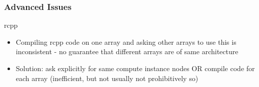 \documentclass[aspectratio=169,notheorems]{beamer}
\theoremstyle{plain}
\theoremstyle{plain}
\numberwithin{equation}{section}
\begin{document}
\begin{frame}
\frametitle{Advanced Issues}
rcpp
\begin{itemize}
\item Compiling rcpp code on one array and asking other arrays to use this is inconsistent - no guarantee that different arrays are of same architecture
\item Solution: ask explicitly for same compute instance nodes OR compile code for each array (inefficient, but not usually not prohibitively so)
\end{itemize}
\end{frame}
\end{document}
